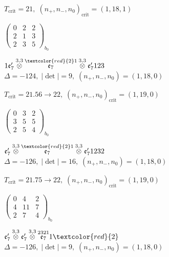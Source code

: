 \documentclass[10pt]{article}
\begin{document}
\hspace{1em}$T_{\text{crit}}=21,\; (n_+,n_-,n_0)_{\text{crit}}=(1,18,1)$

\hspace{2em}$\left(\begin{smallmatrix}0 & 2 & 2 \\ 2 & 1 & 3 \\ 2 & 3 & 5\end{smallmatrix}\right)_{\!b_0}$

\smallskip

$1\mathfrak{e}_7'\overset{3,3}{\otimes}\overset{\textcolor{red}{2}1}{\mathfrak{e}_7}\overset{3,3}{\otimes}\mathfrak{e}_7'123$ \quad $\Delta=-124,\; |\det|=9,\; (n_+,n_-,n_0)=(1,18,0)$

\hspace{1em}$T_{\text{crit}}=21.56 \to 22,\; (n_+,n_-,n_0)_{\text{crit}}=(1,19,0)$

\hspace{2em}$\left(\begin{smallmatrix}0 & 3 & 2 \\ 3 & 5 & 5 \\ 2 & 5 & 4\end{smallmatrix}\right)_{\!b_0}$

\smallskip

$\mathfrak{e}_7'\overset{3,3}{\otimes}\overset{\textcolor{red}{2}1}{\mathfrak{e}_7}\overset{3,3}{\otimes}\mathfrak{e}_7'1232$ \quad $\Delta=-126,\; |\det|=16,\; (n_+,n_-,n_0)=(1,18,0)$

\hspace{1em}$T_{\text{crit}}=21.75 \to 22,\; (n_+,n_-,n_0)_{\text{crit}}=(1,19,0)$

\hspace{2em}$\left(\begin{smallmatrix}0 & 4 & 2 \\ 4 & 11 & 7 \\ 2 & 7 & 4\end{smallmatrix}\right)_{\!b_0}$

\smallskip

$\mathfrak{e}_7'\overset{3,3}{\otimes}\mathfrak{e}_7'\overset{3,3}{\otimes}\overset{2321}{\mathfrak{e}_7}1\textcolor{red}{2}$ \quad $\Delta=-126,\; |\det|=9,\; (n_+,n_-,n_0)=(1,18,0)$
\end{document}
